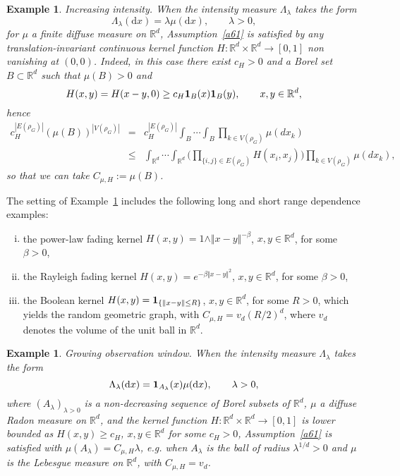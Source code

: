\documentclass[12pt]{article}
\newcommand{\R}{\mathbb{R}}
\newcommand{\bone}{{\bf 1}}
\newtheorem{example}[prop]{Example}
\def\real{{\mathord{\mathbb R}}}
\numberwithin{equation}{section}
\begin{document}
\noindent
\begin{example}
  \label{examplea}
  Increasing intensity. 
  When the intensity measure $\Lambda_\lambda$ takes the form 
$$\Lambda_\lambda (\mathrm{d}x)=\lambda\mu(\mathrm{d}x),\qquad\lambda>0,$$
 for $\mu$ a finite diffuse measure on $\R^d$, 
 Assumption~\ref{a61} is satisfied by any translation-invariant
 continuous kernel function $H : \real^d\times \real^d \to [0,1]$ non vanishing at $(0,0)$. 
 Indeed, in this case there exist $c_H>0$ and a Borel set $B\subset \real^d$
 such that $\mu ( B)>0$ and
$$
H(x,y) = H(x-y,0) \geq c_H \bone_B(x)\bone_B(y), \qquad x,y \in \real^d,
$$
hence 
\begin{eqnarray*} 
  c_H^{|E(\rho_G)|} ( \mu ( B ))^{|V(\rho_G)|} & = & 
  c_H^{|E(\rho_G)|}
  \int_B \cdots \int_B 
  \prod_{k\in V(\rho_G) } \mu (dx_k)
  \\
   & \leq &  
  \int_{\R^d}\cdots\int_{\R^d}
  \Bigg(
  \prod_{\{i,j\}\in E(\rho_G)} H(x_i,x_j)
  \Bigg)
  \prod_{k\in V(\rho_G) } \mu (dx_k), 
\end{eqnarray*}
so that we can take $C_{\mu , H} := \mu (B)$. 
\end{example}
The setting of Example~\ref{examplea}
 includes the following long and short range dependence examples: 
\begin{enumerate}[i)]
\item
 the power-law fading kernel 
 $H(x,y) = 1 \wedge \Vert x - y \Vert^{- \beta}$, $x,y\in \real^d$, for some $\beta > 0$,  
\item
 the Rayleigh fading kernel $H(x,y) = e^{ - \beta \Vert x - y\Vert^2}$, $x,y\in \real^d$, for some $\beta > 0$, 
\item
 the Boolean kernel $H(x,y)=\bone_{\{\|x-y\|\leq R \}}$, $x,y\in \real^d$,
 for some $R >0$, which yields the random geometric graph, with
 $C_{\mu , H} = v_d (R /2)^d$,
 where $v_d$ denotes the volume of the unit ball in $\real^d$. 
\end{enumerate}
\vspace{-0.8cm}
\noindent
\begin{example}
  \label{exampleb}
  Growing observation window. 
  When the intensity measure $\Lambda_\lambda$ takes the form 
$$\Lambda_\lambda (\mathrm{d}x)= {\bf 1}_{A_\lambda} (x) \mu(\mathrm{d}x),\qquad\lambda>0,$$
  where $(A_\lambda )_{\lambda >0}$ is a non-decreasing sequence
  of Borel subsets of $\real^d$, 
  $\mu$ a %
  diffuse Radon measure on $\R^d$, 
  and the kernel function $H : \real^d\times \real^d \to [0,1]$
  is lower bounded as $H(x,y) \geq c_H$, $x,y\in \real^d$ for some $c_H>0$,
  Assumption~\ref{a61} is satisfied with 
  $\mu ( A_\lambda ) = C_{\mu , H} \lambda$,
  e.g. when $A_\lambda$ is  the ball of radius $\lambda^{1/d} >0$
  and $\mu$ is the Lebesgue measure on $\real^d$,
  with $C_{\mu , H} = v_d$. 
\end{example} 
\end{document}
